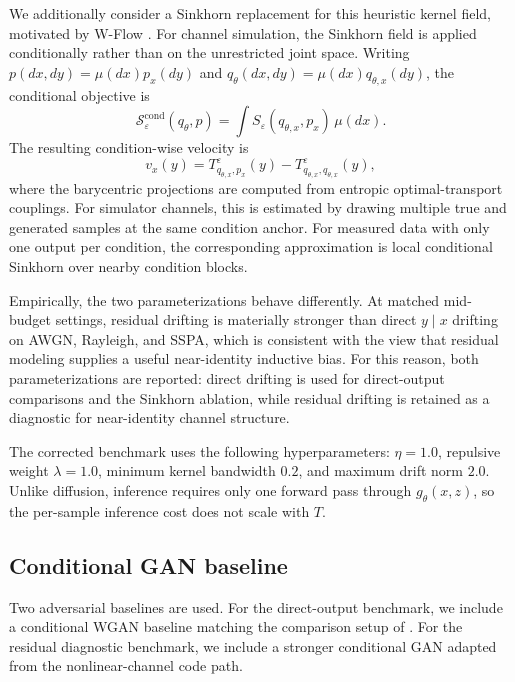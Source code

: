 We additionally consider a Sinkhorn replacement for this heuristic kernel field, motivated by W-Flow \cite{han2026wflow}.
For channel simulation, the Sinkhorn field is applied conditionally rather than on the unrestricted joint space.
Writing \(p(dx,dy)=\mu(dx)p_x(dy)\) and \(q_\theta(dx,dy)=\mu(dx)q_{\theta,x}(dy)\), the conditional objective is
\begin{equation}
\mathcal S_\varepsilon^{\mathrm{cond}}(q_\theta,p)
=
\int S_\varepsilon(q_{\theta,x},p_x)\,\mu(dx).
\end{equation}
The resulting condition-wise velocity is
\begin{equation}
v_x(y)
=
T^\varepsilon_{q_{\theta,x},p_x}(y)
-
T^\varepsilon_{q_{\theta,x},q_{\theta,x}}(y),
\end{equation}
where the barycentric projections are computed from entropic optimal-transport couplings.
For simulator channels, this is estimated by drawing multiple true and generated samples at the same condition anchor.
For measured data with only one output per condition, the corresponding approximation is local conditional Sinkhorn over nearby condition blocks.

Empirically, the two parameterizations behave differently.
At matched mid-budget settings, residual drifting is materially stronger than direct \(y \mid x\) drifting on AWGN, Rayleigh, and SSPA, which is consistent with the view that residual modeling supplies a useful near-identity inductive bias.
For this reason, both parameterizations are reported: direct drifting is used for direct-output comparisons and the Sinkhorn ablation, while residual drifting is retained as a diagnostic for near-identity channel structure.

The corrected benchmark uses the following hyperparameters:
\(\eta = 1.0\),
repulsive weight \(\lambda = 1.0\),
minimum kernel bandwidth \(0.2\),
and maximum drift norm \(2.0\).
Unlike diffusion, inference requires only one forward pass through \(g_\theta(x, z)\), so the per-sample inference cost does not scale with \(T\).

\subsection{Conditional GAN baseline}
Two adversarial baselines are used.
For the direct-output benchmark, we include a conditional WGAN baseline matching the comparison setup of \cite{paper2309}.
For the residual diagnostic benchmark, we include a stronger conditional GAN adapted from the nonlinear-channel code path.


